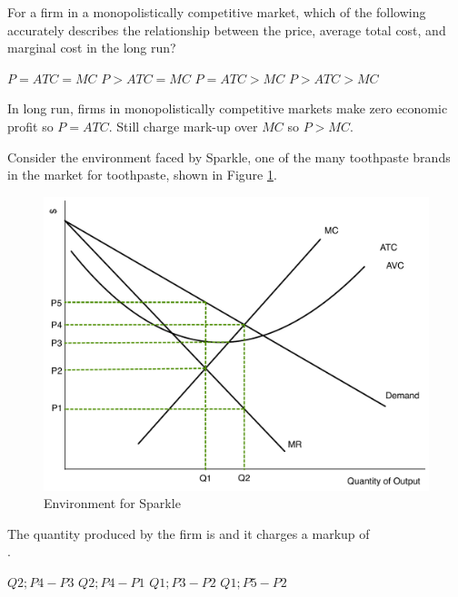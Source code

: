 \documentclass[addpoints,11pt]{exam}
\theoremstyle{definition}
\begin{document}
\begin{questions}
			
		\question For a firm in a monopolistically competitive market, which of the following accurately describes the relationship between the price, average total cost, and marginal cost in the long run?
		
		\begin{choices}
			\choice $P = ATC = MC$
			\choice $P > ATC = MC$
			\CorrectChoice $P = ATC > MC$
			\choice $P > ATC > MC$
		\end{choices}
		
		\begin{solution}
			In long run, firms in monopolistically competitive markets make zero economic profit so $P=ATC$. Still charge mark-up over $MC$ so $P>MC$.
		\end{solution}
		
		\question Consider the environment faced by Sparkle, one of the many toothpaste brands in the market for toothpaste, shown in Figure \ref{fig1}.
		
		\begin{figure}[ht!]
			\centering
			\includegraphics[scale=.40]{hw5_plot1.pdf}
			\caption{Environment for Sparkle}
			\label{fig1}
		\end{figure}
		
		The quantity produced by the firm is \underline{\hspace{3cm}} and it charges a markup of \\ \underline{\hspace{3cm}}.
		
		\begin{choices}
			\choice $Q2; P4-P3$
			\choice $Q2; P4-P1$
			\choice $Q1; P3-P2$
			\CorrectChoice $Q1; P5-P2$
		\end{choices}
		

\end{questions}
\end{document}
